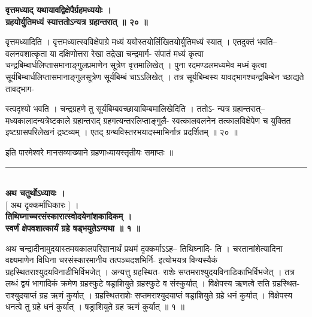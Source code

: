 \documentclass[11pt, openany]{book}
\begin{document}
{{{{\vspace{2mm}
\centering
\textbf{
\hspace{-1.7cm}
 वृत्तमध्याद् यथायावद्विक्षेपैर्ग्रहमध्ययोः ।\\ 
 ग्रहयोर्युतिमध्यं स्यात्ततोऽन्यत्र ग्रहान्तरात् ॥ २० ॥ }

\vspace{2mm}
\justifying
 वृत्तमध्यादिति । वृत्तमध्यात्स्वविक्षेपाग्रे मध्यं
ययोस्तयोर्लिखितयोर्युतिमध्यं 
स्यात् । एतदुक्तं भवति-- वलनवशात्कृता या दक्षिणोत्तरा रेखा
तद्रेखा चन्द्रमार्ग-
संपातं मध्यं कृत्वा चन्द्रबिम्बार्धलिप्तासमानाङ्गुलप्रमाणेन सूत्रेण
वृत्तमालिखेत् । 
पुना रदमण्डलमध्यमेव मध्मं कृत्वा सूर्यबिम्बार्धलिप्तासमानाङ्गुलसूत्रेण
सूर्यबिम्बं 
चाऽऽलिखेत् । तत्र सूर्यबिम्बस्य यावद्भागश्चन्द्रबिम्बेन च्छाद्यते
तावद्भाग-

\newpage
\thispagestyle{fancy}
\fancyhf{}
\lhead{[दृक्कर्माधिकारः]}
\justifying
\noindent
स्त्वदृश्यो भवति । चन्द्रग्रहणे तु सूर्यबिम्बवच्छायाबिम्बमालिखेदिति
। ततोऽ-
न्यत्र ग्रहान्तरात्-- मध्यकालादन्यत्रेष्टकाले ग्रहान्तराद्
ग्रहगत्यन्तरलिप्ताङ्गुलै-
स्वत्कालवलनेन तत्कालविक्षेपेण च युक्तित इष्टग्रासपरिलेखनं द्रष्टव्यम्
। एतद्
ग्रन्थविस्तरभयादस्माभिर्नात्र प्रदर्शितम् ॥ २० ॥

\vspace{2mm}
\centering
 इति पारमेश्वरे मानसव्याख्याने ग्रहणाध्यायस्तृतीयः समाप्तः ॥\\

\vspace{2mm}
\rule{0.2\linewidth}{1.0pt}\\

\vspace{2mm}
\centering
\textbf{\large
 अथ चतुर्थोऽध्यायः ।}\\

 [ अथ दृक्कर्माधिकारः ] ।\\

\vspace{2mm}
\hspace{-0.7cm}
\textbf{
 तिथिघ्नाच्चरसंस्कारात्स्वोदयेनांशकादिकम् ।\\
 स्वर्णं क्षेपवशात्कार्यं ग्रहे षड्भयुतेऽन्यथा ॥ १ ॥}

\vspace{2mm}
\justifying
 अथ चन्द्रादीनामुदयास्तमयकालपरिज्ञानार्थं प्रथमं दृक्कर्माऽऽह--
तिथिघ्नादि-
ति । चरतानांशेत्यादिना वक्ष्यमाणेन विधिना चरसंस्कारमानीय
तत्पञ्चदशभिर्नि-
इत्योभयत्र विन्यस्यैकं ग्रहस्थितराश्युदयविनाडीभिर्विभजेत् । अन्यत्तु
ग्रहस्थित-
राशेः सप्तमराश्युदयविनाडिकाभिर्विभजेत् । तत्र लब्धं द्वयं भागादिकं
क्रमेण
ग्रहस्फुटे षड्राशियुते ग्रहस्फुटे व संस्कुर्यात् । विक्षेपस्य ऋणत्वे
सति ग्रहस्थित-
राश्युदयाप्तं ग्रह ऋणं कुर्यात् । ग्रहस्थितराशेः सप्तमराश्युदयाप्तं
षड्राशियुते
ग्रहे धनं कुर्यात् । विक्षेपस्य धनत्वे तु ग्रहे धनं कुर्यात् ।
षड्राशियुते ग्रह ऋणं
कुर्यात् ॥ १ ॥

}}}}
\end{document}
